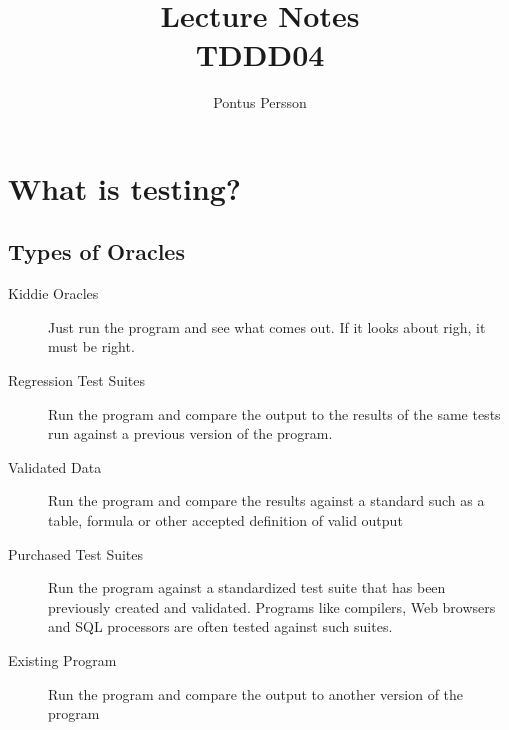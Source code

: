 \documentclass[a4paper]{article}
\author{Pontus Persson}
\title{Lecture Notes\\TDDD04}
\begin{document}
\maketitle
\tableofcontents

\section{What is testing?}


\subsection{Types of Oracles}
\begin{description}
  \item[Kiddie Oracles] Just run the program and see what comes out. If it looks
    about righ, it must be right.
  \item[Regression Test Suites] Run the program and compare the output to the
    results of the same tests run against a previous version of the program.
  \item[Validated Data] Run the program and compare the results against a
    standard such as a table, formula or other accepted definition of valid
    output
  \item[Purchased Test Suites] Run the program against a standardized test suite
    that has been previously created and validated. Programs like compilers, Web
    browsers and SQL processors are often tested against such suites.
  \item[Existing Program] Run the program and compare the output to another
    version of the program
\end{description}
\end{document}
